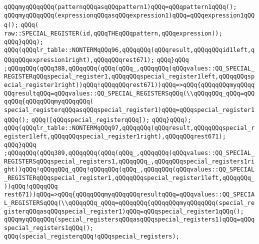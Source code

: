 \verb|qQQqmyqQQqqQQq(patternqQQqasqQQqpattern1)qQQq=qQQqpattern1qQQq();|\newline
\verb|qQQqmyqQQqqQQq(expressionqQQqasqQQqexpression1)qQQq=qQQqexpression1qQQq();|\newline
\verb|qQQq(|\newline
\verb|raw::SPECIAL_REGISTER(id,qQQqTHEqQQqpattern,qQQqexpression));|\newline
\verb|qQQq}qQQq);|\newline
\verb|qQQq(qQQqlr_table::NONTERMqQQq96,qQQqqQQq(qQQqresult,qQQqqQQqid1left,qQQqqQQqexpression1right),qQQqqQQqrest671);|\newline
\verb|qQQq}qQQq|\newline
\verb|;qQQqqQQq(qQQq388,qQQqqQQq(qQQq(qQQq_,qQQqqQQq(qQQqvalues::QQ_SPECIAL_REGISTERqQQqspecial_register1,qQQqqQQqspecial_register1left,qQQqqQQqspecial_register1right))qQQq!qQQqqQQqrest671))qQQq=>qQQq{qQQqqQQqmyqQQqqQQqresultqQQq=qQQqvalues::QQ_SPECIAL_REGISTERSqQQq(\\qQQqqQQq_qQQq=qQQqqQQq{qQQqqQQqmyqQQqqQQq(|\newline
\verb|special_registerqQQqasqQQqspecial_register1)qQQq=qQQqspecial_register1qQQq();|\newline
\verb|qQQq([qQQqspecial_registerqQQq]);|\newline
\verb|qQQq}qQQq);|\newline
\verb|qQQq(qQQqlr_table::NONTERMqQQq97,qQQqqQQq(qQQqresult,qQQqqQQqspecial_register1left,qQQqqQQqspecial_register1right),qQQqqQQqrest671);|\newline
\verb|qQQq}qQQq|\newline
\verb|;qQQqqQQq(qQQq389,qQQqqQQq(qQQq(qQQq_,qQQqqQQq(qQQqvalues::QQ_SPECIAL_REGISTERSqQQqspecial_registers1,qQQqqQQq_,qQQqqQQqspecial_registers1right))qQQq!qQQqqQQq_qQQq!qQQqqQQq(qQQq_,qQQqqQQq(qQQqvalues::QQ_SPECIAL_REGISTERqQQqspecial_register1,qQQqqQQqspecial_register1left,qQQqqQQq_))qQQq!qQQqqQQq|\newline
\verb|rest671))qQQq=>qQQq{qQQqqQQqmyqQQqqQQqresultqQQq=qQQqvalues::QQ_SPECIAL_REGISTERSqQQq(\\qQQqqQQq_qQQq=qQQqqQQq{qQQqqQQqmyqQQqqQQq(special_registerqQQqasqQQqspecial_register1)qQQq=qQQqspecial_register1qQQq();|\newline
\verb|qQQqmyqQQqqQQq(special_registersqQQqasqQQqspecial_registers1)qQQq=qQQq|\newline
\verb|special_registers1qQQq();|\newline
\verb|qQQq(special_registerqQQq!qQQqspecial_registers);|\newline
